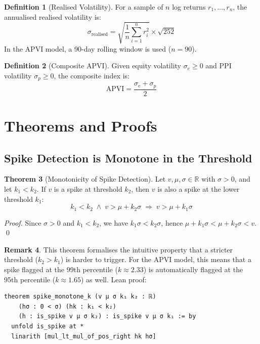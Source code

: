 \documentclass[12pt, a4paper]{article}
\theoremstyle{definition}
\newtheorem{theorem}{Theorem}[section]
\newtheorem{definition}[theorem]{Definition}
\newtheorem{remark}[theorem]{Remark}
\begin{document}
\begin{definition}[Realised Volatility]
For a sample of $n$ log returns $r_1, \ldots, r_n$, the annualised
realised volatility is:
\[
    \sigma_{\text{realised}} = \sqrt{\frac{1}{n}\sum_{i=1}^{n} r_i^2}
    \times \sqrt{252}
\]
In the APVI model, a 90-day rolling window is used ($n = 90$).
\end{definition}

\begin{definition}[Composite APVI]
Given equity volatility $\sigma_e \geq 0$ and PPI volatility
$\sigma_p \geq 0$, the composite index is:
\[
    \text{APVI} = \frac{\sigma_e + \sigma_p}{2}
\]
\end{definition}

\section{Theorems and Proofs}

\subsection{Spike Detection is Monotone in the Threshold}

\begin{theorem}[Monotonicity of Spike Detection]
\label{thm:spike_monotone}
Let $v, \mu, \sigma \in \mathbb{R}$ with $\sigma > 0$, and let
$k_1 < k_2$. If $v$ is a spike at threshold $k_2$, then $v$ is also
a spike at the lower threshold $k_1$:
\[
    k_1 < k_2 \;\wedge\; v > \mu + k_2\sigma
    \;\Longrightarrow\; v > \mu + k_1\sigma
\]
\end{theorem}

\begin{proof}
Since $\sigma > 0$ and $k_1 < k_2$, we have $k_1\sigma < k_2\sigma$,
hence $\mu + k_1\sigma < \mu + k_2\sigma < v$. \qed
\end{proof}

\begin{remark}
This theorem formalises the intuitive property that a stricter threshold
($k_2 > k_1$) is harder to trigger. For the APVI model, this means that
a spike flagged at the 99th percentile ($k \approx 2.33$) is automatically
flagged at the 95th percentile ($k \approx 1.65$) as well. Lean proof:
\begin{lstlisting}
theorem spike_monotone_k (v μ σ k₁ k₂ : ℝ)
    (hσ : 0 < σ) (hk : k₁ < k₂)
    (h : is_spike v μ σ k₂) : is_spike v μ σ k₁ := by
  unfold is_spike at *
  linarith [mul_lt_mul_of_pos_right hk hσ]
\end{lstlisting}
\end{remark}
\end{document}
